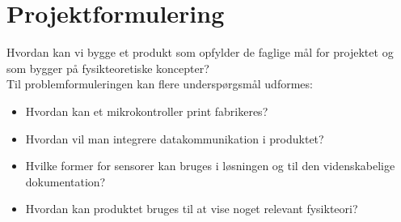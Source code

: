 \section{Projektformulering}

Hvordan kan vi bygge et produkt som opfylder de faglige mål for projektet og som bygger på fysikteoretiske koncepter?\\

Til problemformuleringen kan flere underspørgsmål udformes:
\begin{itemize}
\item Hvordan kan et mikrokontroller print fabrikeres?
\item Hvordan vil man integrere datakommunikation i produktet? 
\item Hvilke former for sensorer kan bruges i løsningen og til den videnskabelige dokumentation?
\item Hvordan kan produktet bruges til at vise noget relevant fysikteori?
\end{itemize}

